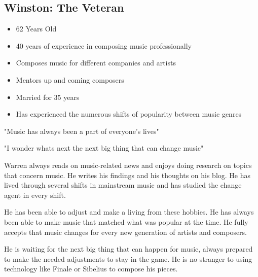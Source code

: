 

  \begin{comment}
  \begin{wrapfigure}{l}{0.5\textwidth}
    \begin{center}
      \texttt{[image: winston\_persona]}
    \end{center}
  \end{wrapfigure}
  \end{comment}

  \subsection{Winston: The Veteran}

  \begin{itemize}
  \item 62 Years Old
  \item 40 years of experience in composing music professionally
  \item Composes music for different companies and artists
  \item Mentors up and coming composers
  \item Married for 35 years
  \item Has experienced the numerous shifts of popularity between music genres
  \end{itemize}

  "Music has always been a part of everyone's lives" 

  "I wonder whats next the next big thing that can change music" 

  Warren always reads on music-related news and enjoys doing research on topics that concern music. He writes his findings and his thoughts on his blog. He has lived through several shifts in mainstream music and has studied the change agent in every shift. 

  He has been able to adjust and make a living from these hobbies. He has always been able to make music that matched what was popular at the time. He fully accepts that music changes for every new generation of artists and composers.

  He is waiting for the next big thing that can happen for music, always prepared to make the needed adjustments to stay in the game. He is no stranger to using technology like Finale or Sibelius to compose his pieces.

